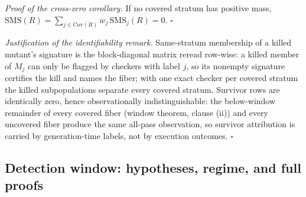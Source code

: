 \documentclass[manuscript,screen,review]{acmart}
\begin{document}
\emph{Proof of the cross-zero corollary.} If no covered stratum has
positive mass,
$\mathrm{SMS}(R) = \sum_{j \in \mathrm{Cov}(R)} w_j\,\mathrm{SMS}_j(R) = 0$.
$\square$

\emph{Justification of the identifiability remark.} Same-stratum
membership of a killed mutant's signature is the block-diagonal matrix
reread row-wise: a killed member of $M_j$ can only be flagged by
checkers with label $j$, so its nonempty signature certifies the kill
and names the fiber; with one exact checker per covered stratum the
killed subpopulations separate every covered stratum. Survivor rows are
identically zero, hence observationally indistinguishable: the
below-window remainder of every covered fiber (window theorem, clause
(ii)) and every uncovered fiber produce the same all-pass observation,
so survivor attribution is carried by generation-time labels, not by
execution outcomes. $\square$

\subsection{Detection window: hypotheses, regime, and full proofs}\label{g.8-window-proofs}
\end{document}
